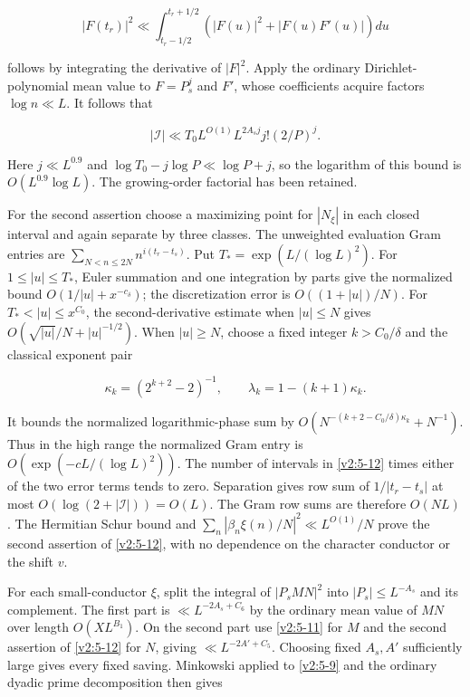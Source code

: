 \documentclass[11pt]{article}
\theoremstyle{definition}
\theoremstyle{remark}
\numberwithin{equation}{section}
\begin{document}
\begin{equation}
|F(t_r)|^2\ll\int_{t_r-1/2}^{t_r+1/2}(|F(u)|^2+|F(u)F'(u)|)du
\end{equation}


follows by integrating the derivative of $|F|^2$. Apply the ordinary Dirichlet-polynomial mean value to $F=P_s^j$ and $F'$, whose coefficients acquire factors $\log n\ll L$. It follows that


\begin{equation}
|\mathcal I|\ll T_0L^{O(1)}L^{2A_sj}j!(2/P)^j.
\end{equation}


Here $j\ll L^{0.9}$ and $\log T_0-j\log P\ll\log P+j$, so the logarithm of this bound is $O(L^{0.9}\log L)$. The growing-order factorial has been retained.

For the second assertion choose a maximizing point for $|N_\xi|$ in each closed interval and again separate by three classes. The unweighted evaluation Gram entries are $\sum_{N<n\le2N}n^{i(t_r-t_s)}$. Put $T_*=\exp(L/(\log L)^2)$. For $1\le|u|\le T_*$, Euler summation and one integration by parts give the normalized bound $O(1/|u|+x^{-c_\delta})$; the discretization error is $O((1+|u|)/N)$. For $T_*<|u|\le x^{C_0}$, the second-derivative estimate when $|u|\le N$ gives $O(\sqrt{|u|}/N+|u|^{-1/2})$. When $|u|\ge N$, choose a fixed integer $k>C_0/\delta$ and the classical exponent pair


\begin{equation}
\kappa_k=(2^{k+2}-2)^{-1},\qquad\lambda_k=1-(k+1)\kappa_k.
\end{equation}


It bounds the normalized logarithmic-phase sum by $O(N^{-(k+2-C_0/\delta)\kappa_k}+N^{-1})$. Thus in the high range the normalized Gram entry is $O(\exp(-cL/(\log L)^2))$. The number of intervals in \eqref{v2:5-12} times either of the two error terms tends to zero. Separation gives row sum of $1/|t_r-t_s|$ at most $O(\log(2+|\mathcal I|))=O(L)$. The Gram row sums are therefore $O(NL)$. The Hermitian Schur bound and $\sum_n|\beta_n\xi(n)/N|^2\ll L^{O(1)}/N$ prove the second assertion of \eqref{v2:5-12}, with no dependence on the character conductor or the shift $v$.

For each small-conductor $\xi$, split the integral of $|P_sMN|^2$ into $|P_s|\le L^{-A_s}$ and its complement. The first part is $\ll L^{-2A_s+C_6}$ by the ordinary mean value of $MN$ over length $O(XL^{B_1})$. On the second part use \eqref{v2:5-11} for $M$ and the second assertion of \eqref{v2:5-12} for $N$, giving $\ll L^{-2A'+C_5}$. Choosing fixed $A_s,A'$ sufficiently large gives every fixed saving. Minkowski applied to \eqref{v2:5-9} and the ordinary dyadic prime decomposition then gives
\end{document}
